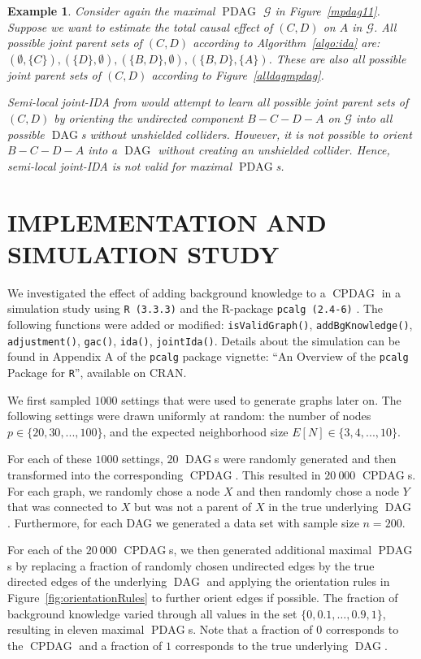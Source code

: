 \documentclass[letterpaper]{article}
\newtheorem{example}[theorem]{Example}
\theoremstyle{definition}
\theoremstyle{remark}
\DeclareMathOperator{\PDAG}{PDAG}
\DeclareMathOperator{\CPDAG}{CPDAG}
\DeclareMathOperator{\DAG}{DAG}
\newcommand{\mpdag}{maximal $\PDAG$}
\newcommand{\g}[1][G]{\mathcal{#1}}
\begin{document}
\begin{example}
Consider again the \mpdag{} $\g$ in Figure~\ref{mpdag11}. Suppose we want to estimate the total causal effect of $(C,D)$ on $A$ in $\g$.
All possible joint parent sets of $(C,D)$ according to Algorithm~\ref{algo:ida} are: $(\emptyset,\{C\}), (\{D\},\emptyset), (\{B,D\},\emptyset), (\{B,D\},\{A\})$. These are also all possible joint parent sets of $(C,D)$ according to Figure~\ref{alldagmpdag}.

Semi-local joint-IDA from \cite{nandy2014estimating} would attempt to learn all possible joint parent sets of $(C,D)$ by orienting the undirected component $B-C-D-A$ on $\g$ into all possible $\DAG$s without unshielded colliders. However, it is not possible to orient $B-C-D-A$ into a $\DAG$ without creating an unshielded collider. Hence, semi-local joint-IDA is not valid for \mpdag{}s.
\label{ex:semiloc-jida}
\end{example}

\section{IMPLEMENTATION AND SIMULATION STUDY} \label{sec:sim}

We investigated the effect of adding background
knowledge to a $\CPDAG$ in a simulation study using \texttt{R (3.3.3)} and the R-package \texttt{pcalg (2.4-6)} \citep{kalischpcalg}. The following functions were added or modified: \texttt{isValidGraph()}, \texttt{addBgKnowledge()}, \texttt{adjustment()}, \texttt{gac()}, \texttt{ida()}, \texttt{jointIda()}. Details about the simulation can be found in Appendix A of the \texttt{pcalg} package vignette: ``An Overview of the \texttt{pcalg} Package for \texttt{R}'', available on CRAN.
 
We first sampled $1000$ settings that were used
to generate graphs later on. The following settings were drawn uniformly at random:
the number of nodes $p \in \{20, 30, ..., 100\}$, and the expected neighborhood size $E[N] \in \{3, 4, ...,10\}$.

For each of these $1000$ settings, $20$ $\DAG$s were randomly generated and then transformed into the
corresponding $\CPDAG$. This resulted in
$20\ 000$ $\CPDAG$s. For each graph, we randomly chose a node $X$ and then
randomly chose a node $Y$ that was connected to $X$ but was not a parent of
$X$ in the true underlying $\DAG$. Furthermore, for each DAG we generated a data set with sample size $n=200$.

For each of the $20\ 000$ $\CPDAG$s, we then generated additional \mpdag{}s by
replacing a fraction of randomly chosen undirected edges by the
true directed edges of the underlying $\DAG$ and applying the orientation
rules in Figure~\ref{fig:orientationRules} to further orient edges if possible. The fraction of background knowledge varied through all
values in the set $\{0, 0.1, \dots, 0.9, 1\}$, resulting in eleven \mpdag{}s. Note that a fraction of $0$ corresponds to the $\CPDAG$ and a fraction of $1$ corresponds
to the true underlying $\DAG$.
\end{document}
